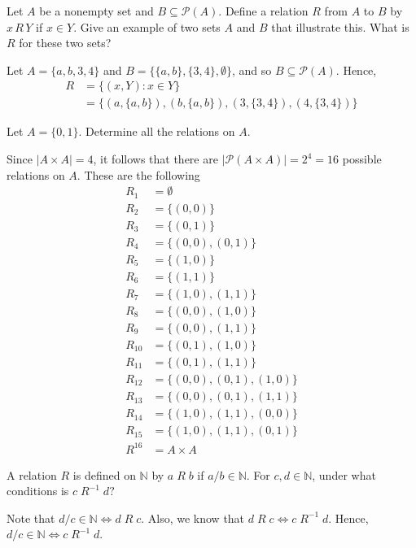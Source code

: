 \documentclass[12pt]{article}
\newcommand{\N}{\mathbb{N}}
\newenvironment{problem}[2][Problem]{\begin{trivlist}
		\item[\hskip \labelsep {\bfseries #1}\hskip \labelsep {\bfseries #2.}]}{\end{trivlist}}
\newenvironment{solution}[2][Solution]{\begin{trivlist}
		\item[\hskip \labelsep {\bfseries #1}\hskip \labelsep {\bfseries #2.}]}{\end{trivlist}}
\begin{document}
	\begin{problem}{2}
		Let $A$ be a nonempty set and $B\subseteq \mathcal{P}(A)$. Define a relation $R$ from $A$ to $B$ by $x \, R \, Y$ if $x\in Y$. Give an example of two sets $A$ and $B$ that illustrate this. What is $R$ for these two sets?
		\begin{solution}{2}
			Let $A=\{a,b,3,4\}$ and $B=\{\{a,b\},\{3,4\},\emptyset\}$, and so $B\subseteq \mathcal{P}(A)$. Hence,
			\begin{align*}
			 R&=\{(x,Y):x\in Y\}\\
			 &=\{(a,\{a,b\}),(b,\{a,b\}), (3,\{3,4\}), (4,\{3,4\}) \}
		 	\end{align*}
		\end{solution}
	\end{problem}

	\begin{problem}{3}
		Let $A=\{0,1\}$. Determine all the relations on $A$.
		\begin{solution}{3}
			Since $|A\times A|=4$, it follows that there are $|\mathcal{P}(A\times A)|=2^{4} = 16$ possible relations on $A$.  These are the following
			\begin{align*}
				R_{1} &= \emptyset\\
				R_{2} &= \{(0,0)\}\\
				R_{3} &= \{(0,1)\}\\
				R_{4} &= \{(0,0),(0,1)\}\\
				R_{5} &= \{(1,0)\}\\
				R_{6} &= \{(1,1)\}\\
				R_{7} &= \{(1,0),(1,1)\}\\
				R_{8} &= \{(0,0),(1,0)\}\\
				R_{9} &= \{(0,0),(1,1)\}\\
				R_{10} &= \{(0,1),(1,0)\}\\
				R_{11} &= \{(0,1),(1,1)\}\\
				R_{12} &= \{(0,0),(0,1), (1,0)\}\\
				R_{13} &= \{(0,0),(0,1),(1,1)\}\\
				R_{14} &= \{(1,0),(1,1),(0,0)\}\\
				R_{15} &= \{(1,0),(1,1),(0,1)\}\\
				R^{16} &= A\times A
			\end{align*}
		\end{solution}
	\end{problem}

	\begin{problem}{6}
		A relation $R$ is defined on $\N$ by $a \; R \; b$ if $a/b \in \N$. For $c,d\in \N$, under what conditions is $c \; R^{-1} \; d?$ 
		\begin{solution}{6}
			Note that $d/c\in \N \iff d\; R\;c$. Also, we know that $d \; R \; c \iff c \; R^{-1} \; d$. Hence, $d/c \in \N \iff c \; R^{-1} \; d$. 
		\end{solution}
	\end{problem} 
\end{document}
